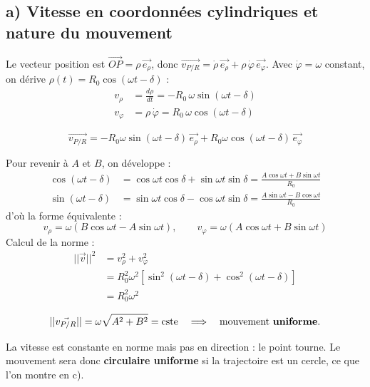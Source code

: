 \documentclass[11pt,a4paper]{article}
\begin{document}
\subsection*{a) Vitesse en coordonnées cylindriques et nature du mouvement}
Le vecteur position est $\vec{OP} = \rho\,\vec{e_\rho}$, donc $\vec{v_{P/R}} = \dot\rho\,\vec{e_\rho} + \rho\,\dot\varphi\,\vec{e_\varphi}$. Avec $\dot\varphi = \omega$ constant, on dérive $\rho(t) = R_0\cos(\omega t-\delta)$ :
\begin{align*}
v_\rho &= \frac{d\rho}{dt} = -R_0\,\omega\sin(\omega t - \delta) \\
v_\varphi &= \rho\,\dot\varphi = R_0\,\omega\cos(\omega t - \delta)
\end{align*}
\begin{sonucbox}
$$ \vec{v_{P/R}} = -R_0\omega\sin(\omega t-\delta)\,\vec{e_\rho} + R_0\omega\cos(\omega t-\delta)\,\vec{e_\varphi} $$
\end{sonucbox}
Pour revenir à $A$ et $B$, on développe :
\begin{align*}
\cos(\omega t-\delta) &= \cos\omega t\cos\delta + \sin\omega t\sin\delta = \frac{A\cos\omega t + B\sin\omega t}{R_0} \\
\sin(\omega t-\delta) &= \sin\omega t\cos\delta - \cos\omega t\sin\delta = \frac{A\sin\omega t - B\cos\omega t}{R_0}
\end{align*}
d'où la forme équivalente :
$$ v_\rho = \omega\left(B\cos\omega t - A\sin\omega t\right), \qquad v_\varphi = \omega\left(A\cos\omega t + B\sin\omega t\right) $$
Calcul de la norme :
\begin{align*}
||\vec{v}||^2 &= v_\rho^2 + v_\varphi^2 \\
&= R_0^2\omega^2\left[\sin^2(\omega t-\delta) + \cos^2(\omega t-\delta)\right] \\
&= R_0^2\omega^2
\end{align*}
\begin{sonucbox}
$$ ||\vec{v_{P/R}}|| = \omega\sqrt{A^2+B^2} = \text{cste} \quad\Longrightarrow\quad \text{mouvement \textbf{uniforme}.} $$
\end{sonucbox}
La vitesse est constante en norme mais pas en direction : le point tourne. Le mouvement sera donc \textbf{circulaire uniforme} si la trajectoire est un cercle, ce que l'on montre en c).
\end{document}

